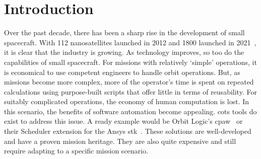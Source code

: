 \glsresetall{} 
\chapter{Introduction}\label{chap:intro}


Over the past decade, there
has been a sharp rise in the development of small spacecraft. With 112
nanosatellites launched in 2012 and 1800 launched in 2021~\cite{nanosats_total_2023}, it is clear that the industry is growing. As
technology improves, so too do the capabilities of small spacecraft. For
missions with relatively ‘simple’ operations, it is economical to use competent
engineers to handle orbit operations. But, as missions become more complex,
more of the operator’s time is spent on repeated calculations using
purpose-built scripts that offer little in terms of reusability. For suitably
complicated operations, the economy of human computation is lost. In this
scenario, the benefits of software automation become appealing.
\gls{cots} tools do exist to address this issue. A ready example
would be Orbit Logic’s \gls{cpaw}~\cite{orbit_logic_cpaw_2021} or their
Scheduler extension for the Ansys \gls{stk}~\cite{ansys_stk_nodate}. These
solutions are well-developed and have a proven mission heritage. They are also
quite expensive and still require adapting to a specific mission scenario.   


